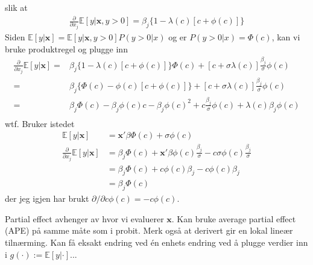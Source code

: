 slik at
\begin{align}
\frac{\partial}{\partial x_j} \mathbb{E}[y|\mathbf{x},y>0] =\beta_j\{1-\lambda(c)[c+\phi(c)]\}
\end{align}
Siden $\mathbb{E}[y|\mathbf{x}] = \mathbb{E}[y|\mathbf{x},y>0]P(y>0|x)$ og er $P(y>0|x)=\Phi(c)$, kan vi bruke produktregel og plugge inn
\begin{align}
\frac{\partial}{\partial x_j}\mathbb{E}[y|\mathbf{x}] =& \beta_j\{1-\lambda(c)[c+\phi(c)]\}\Phi(c)+\left[c + \sigma\lambda(c)\right]\frac{\beta_j}{\sigma}\phi(c)\\
=&\beta_j\{\Phi(c)-\phi(c)[c+\phi(c)]\}+ \left[c + \sigma\lambda(c)\right]\frac{\beta_j}{\sigma}\phi(c)\\
=&\beta_j\Phi(c)-\beta_j\phi(c)c-\beta_j \phi(c)^2 + c\frac{\beta_j}{\sigma}\phi(c) + \lambda(c)\beta_j\phi(c)\\
\end{align}
wtf. Bruker istedet 
\begin{align}
\mathbb{E}[y|\mathbf{x}] &=\mathbf{x}'\beta\Phi(c)+\sigma\phi(c) \\ 
\frac{\partial}{\partial x_j}\mathbb{E}[y|\mathbf{x}]&= \beta_j\Phi(c)+\mathbf{x}'\beta\phi(c)\frac{\beta_j}{\sigma} -c\sigma\phi(c)\frac{\beta_j}{\sigma} \\
&=\beta_j\Phi(c)+c\phi(c)\beta_j -c\phi(c) \beta_j \\
&=\beta_j\Phi(c)
\end{align}
der jeg igjen har brukt $\partial/\partial c \phi(c) = -c\phi(c)$. 

Partial effect avhenger av hvor vi evaluerer $\mathbf{x}$. Kan bruke average partial effect (APE) på samme måte som i probit. Merk også at derivert gir en lokal lineær tilnærming. Kan få eksakt endring ved én enhets endring ved å plugge verdier inn i $g(\cdot) :=\mathbb{E}[y|\cdot]$...
